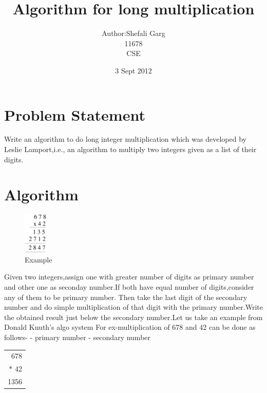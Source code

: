 \documentclass[12pt]{article}
\begin{document}
\title{Algorithm for long multiplication}
\author{Author:Shefali Garg\\11678\\CSE}
\date{3 Sept 2012}
\maketitle
\tableofcontents
\section{Problem Statement}


Write an algorithm to do long integer multiplication which was developed by Leslie
Lamport\cite{lamport94},i.e., an algorithm to multiply two integers given as a list of their digits.

\section{Algorithm}
\begin{figure}
  \vspace{-60pt}
  \begin{center}
    \includegraphics[width=0.1\textwidth]{mult2}
  \end{center}
  \vspace{-20pt}
  \caption{Example}
  \vspace{-20pt}
\end{figure}
Given two integers,assign one with greater number of digits as primary number and other one as seconday number.If both have equal number of digits,consider any of them to be primary number.
\newline
Then take the last digit of the secondary number and do simple multiplication of that digit with the primary number.Write the obtained result just below the secondary number.Let us take an example from Donald Knuth's algo system\cite{knuth79} For ex-multiplication of 678 and 42 can be done as follows-
 - primary number
 - secondary number
\newline
\newline
\begin{tabular}{r}
678\\
$*$ 42\\
\hline
1356\\
\end{tabular}
\end{document}
